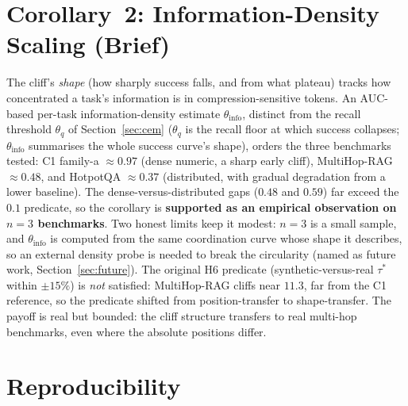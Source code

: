 \section{Corollary~2: Information-Density Scaling (Brief)}
\label{sec:corollary2}
\label{sec:theta_info_def}

The cliff's \emph{shape} (how sharply success falls, and from what
plateau) tracks how concentrated a task's information is in
compression-sensitive tokens. An AUC-based per-task
information-density estimate $\theta_\text{info}$, distinct from the
recall threshold $\theta_q$ of Section~\ref{sec:cem} ($\theta_q$ is
the recall floor at which success collapses; $\theta_\text{info}$
summarises the whole success curve's shape), orders the three
benchmarks tested: C1 family-a $\approx 0.97$ (dense numeric, a sharp
early cliff), MultiHop-RAG $\approx 0.48$, and HotpotQA $\approx 0.37$
(distributed, with gradual degradation from a lower baseline). The
dense-versus-distributed gaps ($0.48$ and $0.59$) far exceed the
$0.1$ predicate, so the corollary is \textbf{supported as an
empirical observation on $n=3$ benchmarks}. Two honest limits keep it
modest: $n=3$ is a small sample, and $\theta_\text{info}$ is computed
from the same coordination curve whose shape it describes, so an
external density probe is needed to break the circularity (named as
future work, Section~\ref{sec:future}). The original H6 predicate
(synthetic-versus-real $\tau^{*}$ within $\pm 15\%$) is \emph{not}
satisfied: MultiHop-RAG cliffs near $11.3$, far from the C1
reference, so the predicate shifted from position-transfer to
shape-transfer. The payoff is real but bounded: the
cliff structure transfers to real multi-hop benchmarks, even where
the absolute positions differ.

\section{Reproducibility}
\label{sec:repro}


